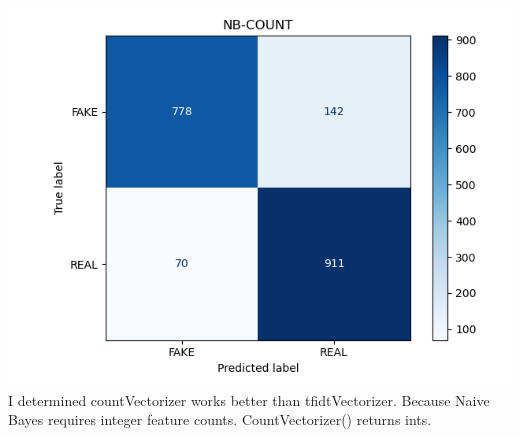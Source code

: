 \documentclass[onecolumn]{article}
\begin{document}
\includegraphics[scale=0.3]{fig/9.PNG}
\bigskip\newline
\noindent
I determined countVectorizer works better than tfidtVectorizer. Because Naive Bayes requires integer feature counts. CountVectorizer() returns ints.
\end{document}
